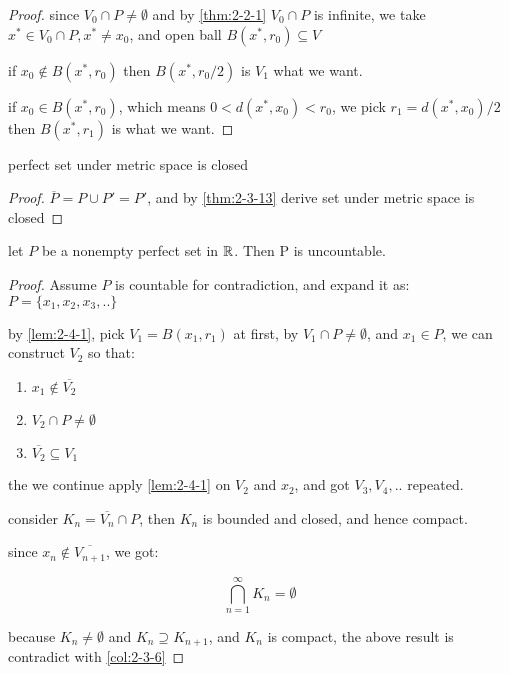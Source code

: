 \begin{proof}
    since $V_0 \cap P \ne \emptyset$ and by \autoref{thm:2-2-1} $V_0 \cap P$ is infinite, we take $x^* \in V_0 \cap P, x^* \ne x_0$, and open ball $B(x^*, r_0) \subseteq V$

    if $x_0 \notin B(x^*, r_0)$ then $B(x^*, r_0/2)$ is $V_1$ what we want.

    if $x_0 \in B(x^*, r_0)$, which means $0 < d(x^*, x_0) < r_0$, we pick $r_1 = d(x^*, x_0)/ 2$
    then $B(x^*, r_1)$ is what we want.

\end{proof}

\begin{thm}
    perfect set under metric space is closed
\end{thm}

\begin{proof}
    $\overline{P} = P \cup P' = P'$, and by \autoref{thm:2-3-13} derive set under metric space is closed
\end{proof}

\begin{thm}
    let $P$ be a nonempty perfect set in $\mathbb{R}$. Then P is uncountable.
\end{thm}

\begin{proof}
    Assume $P$ is countable for contradiction, and expand it as: $P=\{  x_1,x_2,x_3,..\}$

    by \autoref{lem:2-4-1}, pick $V_1 = B(x_1, r_1)$ at first, by $V_1 \cap P \ne \emptyset$, and $x_1 \in P$,
    we can construct $V_2$ so that:
    
    \begin{enumerate}
        \item $x_1 \notin \overline{V_2}$
        \item $V_2 \cap P \ne \emptyset$
        \item $\overline{V_2} \subseteq V_1$
    \end{enumerate}

    the we continue apply \autoref{lem:2-4-1} on $V_2$ and $x_2$, and got $V_3,V_4,..$ repeated.

    consider $K_n = \overline{V_n} \cap P$, then $K_n$ is bounded and closed, and hence compact.

    since $x_n \notin \overline{V_{n+1}}$, we got:
    
    \[
        \bigcap_{n=1}^{\infty} K_n = \emptyset
    \]

    because $K_n \ne \emptyset$ and $K_{n} \supseteq K_{n+1}$, and $K_n$ is compact, the above result
    is contradict with \autoref{col:2-3-6}
\end{proof}

